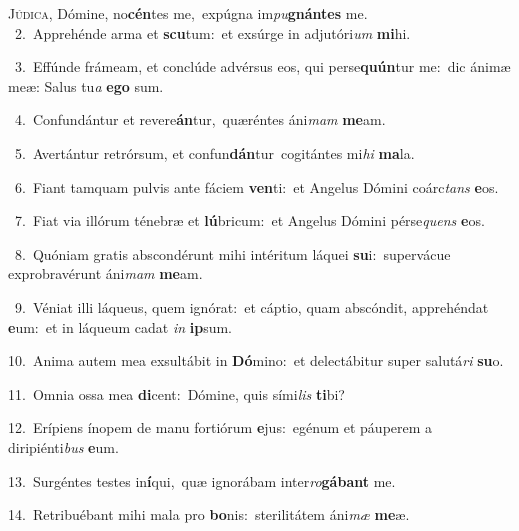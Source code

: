 \lettrine{\initial\textcolor{\initialcolor}{J}}{údica,} Dómine, no\-\textbf{cén}\-tes me,~\star expúgna im\-\textit{pu}\-\textbf{gnán}\textbf{tes} me.\\
{\numbfont\textcolor{\numbcolor}{~2.}}~Apprehénde arma et \textbf{scu}\-tum:~\star et exsúrge in adjutóri\textit{um} \textbf{mi}\-hi.\par
{\numbfont\textcolor{\numbcolor}{~3.}}~Effúnde frámeam, et conclúde advérsus eos, qui perse\-\textbf{quún}\-tur me:~\star dic ánimæ meæ: Salus tu\textit{a} \textbf{e}\-\textbf{go} sum.\par
{\numbfont\textcolor{\numbcolor}{~4.}}~Confundántur et revere\-\textbf{án}\-tur,~\star quæréntes áni\textit{mam} \textbf{me}\-am.\par
{\numbfont\textcolor{\numbcolor}{~5.}}~Avertántur retrórsum, et confun\-\textbf{dán}\-tur~\star cogitántes mi\textit{hi} \textbf{ma}\-la.\par
{\numbfont\textcolor{\numbcolor}{~6.}}~Fiant tamquam pulvis ante fáciem \textbf{ven}\-ti:~\star et Angelus Dómini coárc\textit{tans} \textbf{e}\-os.\par
{\numbfont\textcolor{\numbcolor}{~7.}}~Fiat via illórum ténebræ et \textbf{lú}\-bricum:~\star et Angelus Dómini pérse\textit{quens} \textbf{e}\-os.\par
{\numbfont\textcolor{\numbcolor}{~8.}}~Quóniam gratis abscondérunt mihi intéritum láquei \textbf{su}\-i:~\star supervácue exprobravérunt áni\textit{mam} \textbf{me}\-am.\par
{\numbfont\textcolor{\numbcolor}{~9.}}~Véniat illi láqueus, quem ignórat:~\dagger et cáptio, quam abscóndit, apprehéndat \textbf{e}\-um:~\star et in láqueum cadat \textit{in} \textbf{ip}\-sum.\par
{\numbfont\textcolor{\numbcolor}{10.}}~Anima autem mea exsultábit in \textbf{Dó}\-mino:~\star et delectábitur super salutá\textit{ri} \textbf{su}\-o.\par
{\numbfont\textcolor{\numbcolor}{11.}}~Omnia ossa mea \textbf{di}\-cent:~\star Dómine, quis sími\textit{lis} \textbf{ti}\-bi?\par
{\numbfont\textcolor{\numbcolor}{12.}}~Erípiens ínopem de manu fortiórum \textbf{e}\-jus:~\star egénum et páuperem a diripiénti\textit{bus} \textbf{e}\-um.\par
{\numbfont\textcolor{\numbcolor}{13.}}~Surgéntes testes in\-\textbf{í}\-qui,~\star quæ ignorábam inter\-\textit{ro}\-\textbf{gá}\textbf{bant} me.\par
{\numbfont\textcolor{\numbcolor}{14.}}~Retribuébant mihi mala pro \textbf{bo}\-nis:~\star sterilitátem áni\textit{mæ} \textbf{me}\-æ.\par
